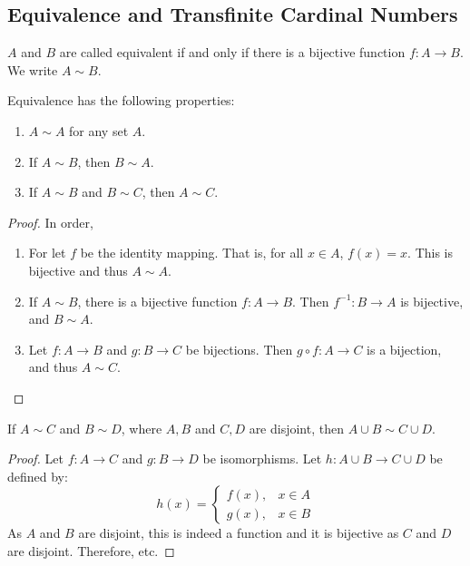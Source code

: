     \subsection{Equivalence and Transfinite Cardinal Numbers}
        \begin{definition}
        $A$ and $B$ are called equivalent if and only if there is a bijective function $f:A\rightarrow B$. We write $A\sim B$.
        \end{definition}
        \begin{theorem}
        Equivalence has the following properties:
        \begin{enumerate}
        \item $A\sim A$ for any set $A$.
        \item If $A\sim B$, then $B\sim A$.
        \item If $A\sim B$ and $B\sim C$, then $A\sim C$.
        \end{enumerate}
        \end{theorem}
        \begin{proof}
        In order,
        \begin{enumerate}
        \item   For let $f$ be the identity mapping. That is, for all
                $x\in A$, $f(x)=x$. This is bijective and thus $A\sim A$.
        \item   If $A\sim B$, there is a bijective function $f:A\rightarrow B$.
                Then $f^{-1}:B\rightarrow A$ is bijective, and $B\sim A$.
        \item   Let $f:A\rightarrow B$ and $g:B\rightarrow C$ be bijections.
                Then $g\circ f:A\rightarrow C$ is a bijection,
                and thus $A\sim C$.
        \end{enumerate}
        \end{proof}
        \begin{theorem}
            If $A\sim{C}$ and $B\sim{D}$, where $A,B$ and $C,D$ are disjoint,
            then $A\cup{B}\sim{C}\cup{D}$.
        \end{theorem}
        \begin{proof}
            Let $f:A\rightarrow C$ and $g:B\rightarrow D$ be isomorphisms.
            Let $h:A\cup{B}\rightarrow{C}\cup{D}$ be defined by:
            \begin{equation}
                h(x)=
                \begin{cases}
                    f(x),&x\in{A}\\
                    g(x),&x\in{B}
                \end{cases}
            \end{equation}
            As $A$ and $B$ are disjoint, this is indeed a function and it is
            bijective as $C$ and $D$ are disjoint. Therefore, etc.
        \end{proof}

